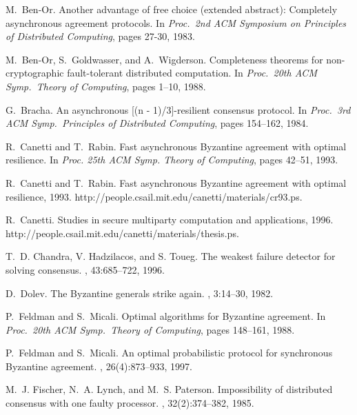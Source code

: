 \documentclass{sig-alternate}
\begin{document}
\begin{thebibliography}{10}




M.~Ben{-}Or.
\newblock Another advantage of free choice (extended abstract): Completely
  asynchronous agreement protocols.
\newblock In {\em Proc.~2nd ACM Symposium on Principles of Distributed
Computing}, pages 27-30, 1983.

M.~Ben{-}Or, S.~Goldwasser, and A.~Wigderson.
\newblock Completeness theorems for non-cryptographic fault-tolerant
  distributed computation.
\newblock In {\em Proc.~20th ACM Symp.~Theory of Computing}, pages 1--10, 1988.

G.~Bracha.
\newblock An asynchronous [(n - 1)/3]-resilient consensus protocol.
\newblock In {\em Proc.~3rd ACM Symp.~Principles of Distributed Computing},
pages 154--162, 1984.

R.~Canetti and T.~Rabin.
\newblock Fast asynchronous Byzantine agreement with optimal resilience.
\newblock In {\em Proc. 25th ACM
Symp. Theory of Computing}, pages 42--51, 1993.

R.~Canetti and T.~Rabin.
\newblock Fast asynchronous Byzantine agreement with optimal resilience, 1993.
\newblock http://people.csail.mit.edu/canetti/materials/cr93.ps.

R.~Canetti.
\newblock Studies in secure multiparty computation and applications, 1996.
\newblock http://people.csail.mit.edu/canetti/materials/thesis.ps.

T.~D. Chandra, V. Hadzilacos, and S. Toueg.
\newblock The weakest failure detector for solving consensus.
, 43:685--722, 1996.

D.~Dolev.
\newblock The Byzantine generals strike again.
, 3:14--30, 1982.

P.~Feldman and S.~Micali.
\newblock Optimal algorithms for Byzantine agreement.
\newblock In {\em Proc.~20th ACM Symp.~Theory of Computing}, pages 148--161,
  1988.

P.~Feldman and S.~Micali.
\newblock An optimal probabilistic protocol for synchronous Byzantine
  agreement.
, 26(4):873--933, 1997.

M.~J. Fischer, N.~A. Lynch, and M.~S. Paterson.
\newblock Impossibility of distributed consensus with one faulty processor.
, 32(2):374--382, 1985.


\end{thebibliography}
\end{document}
